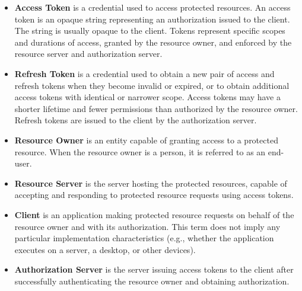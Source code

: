 \begin{itemize}
    \item \textbf{Access Token} is a credential used to access protected resources.
    An access token is an opaque string representing an authorization issued to the client.
    The string is usually opaque to the client.
    Tokens represent specific scopes and
    durations of access, granted by the resource owner, and enforced by the resource server and authorization server.
    \item \textbf{Refresh Token} is a credential used to obtain a new pair of access and refresh tokens when they become
    invalid or expired, or to obtain additional access tokens with identical or narrower scope.
    Access tokens may have a shorter lifetime and fewer permissions than authorized by the resource owner.
    Refresh tokens are issued to the client by the authorization server.
    \item \textbf{Resource Owner} is an entity capable of granting access to a protected resource.
    When the resource owner is a person, it is referred to as an end-user.
    \item \textbf{Resource Server} is the server hosting the protected resources, capable of accepting and responding to protected
    resource requests using access tokens.
    \item \textbf{Client} is an application making protected resource requests on behalf of the resource owner and with its authorization.
    This term does not imply any particular implementation characteristics (e.g., whether the application executes on a server,
    a desktop, or other devices).
    \item \textbf{Authorization Server} is the server issuing access tokens to the client after successfully authenticating the resource owner
    and obtaining authorization.
\end{itemize}